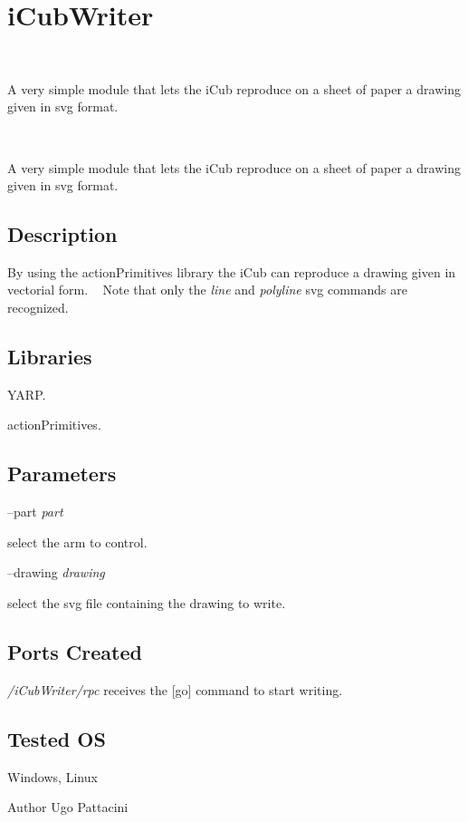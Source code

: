 \section{i\+Cub\+Writer}
\label{group__icub__iCubWriter}


~\newline


A very simple module that lets the i\+Cub reproduce on a sheet of paper a drawing given in svg format.  


~\newline


A very simple module that lets the i\+Cub reproduce on a sheet of paper a drawing given in svg format. 

\hypertarget{group__icub__iCubWriter_intro_sec}{}\subsection{Description}\label{group__icub__iCubWriter_intro_sec}
By using the action\+Primitives library the i\+Cub can reproduce a drawing given in vectorial form. ~\newline
 Note that only the {\itshape line} and {\itshape polyline} svg commands are recognized. ~\newline
\hypertarget{group__icub__iCubWriter_lib_sec}{}\subsection{Libraries}\label{group__icub__iCubWriter_lib_sec}

\begin{DoxyItemize}
\item Y\+A\+RP.
\item action\+Primitives.
\end{DoxyItemize}\hypertarget{group__icub__iCubWriter_parameters_sec}{}\subsection{Parameters}\label{group__icub__iCubWriter_parameters_sec}
--part {\itshape part} 
\begin{DoxyItemize}
\item select the arm to control.
\end{DoxyItemize}

--drawing {\itshape drawing} 
\begin{DoxyItemize}
\item select the svg file containing the drawing to write.
\end{DoxyItemize}\hypertarget{group__icub__iCubWriter_portsc_sec}{}\subsection{Ports Created}\label{group__icub__iCubWriter_portsc_sec}
{\itshape /i\+Cub\+Writer/rpc} receives the \mbox{[}go\mbox{]} command to start writing.\hypertarget{group__icub__iCubWriter_tested_os_sec}{}\subsection{Tested OS}\label{group__icub__iCubWriter_tested_os_sec}
Windows, Linux

\begin{DoxyAuthor}{Author}
Ugo Pattacini 
\end{DoxyAuthor}
